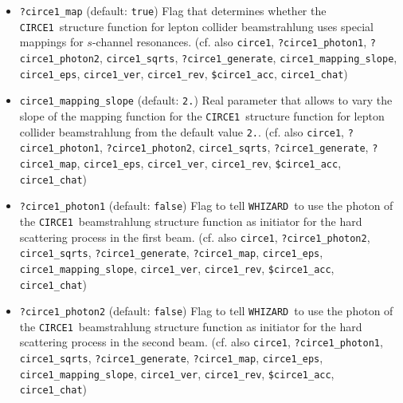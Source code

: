 \documentclass[12pt]{book}
\newcommand{\ttt}[1]{\texttt{#1}}
\newcommand{\whizard}{\texttt{WHIZARD}}
\newcommand{\circeone}{\texttt{CIRCE1}}
\begin{document}
\begin{itemize}
\ttt{?circe1\_map}, \ttt{circe1\_mapping\_slope}, \ttt{circe1\_eps},
\newline \ttt{circe1\_ver}, \ttt{circe1\_rev}, \ttt{\$circe1\_acc},
\ttt{circe1\_chat}) 
\item
\ttt{?circe1\_map} \qquad (default: \ttt{true}) \newline
Flag that determines whether the \circeone\ structure function for
lepton collider beamstrahlung uses special mappings for $s$-channel
resonances. (cf. also \ttt{circe1}, \ttt{?circe1\_photon1},
\newline \ttt{?circe1\_photon2},  \ttt{circe1\_sqrts},
\ttt{?circe1\_generate}, \ttt{circe1\_mapping\_slope}, \ttt{circe1\_eps},
\newline \ttt{circe1\_ver}, \ttt{circe1\_rev}, \ttt{\$circe1\_acc},
\ttt{circe1\_chat}) 
\item
\ttt{circe1\_mapping\_slope} \qquad (default: \ttt{2.}) \newline
Real parameter that allows to vary the slope of the mapping function
for the \circeone\ structure function for lepton collider
beamstrahlung from the default value \ttt{2.}. (cf. also
\ttt{circe1}, \ttt{?circe1\_photon1}, \ttt{?circe1\_photon2}, 
\ttt{circe1\_sqrts},  \ttt{?circe1\_generate}, \ttt{?circe1\_map},
\ttt{circe1\_eps}, \ttt{circe1\_ver}, \ttt{circe1\_rev},
\ttt{\$circe1\_acc}, \ttt{circe1\_chat}) 
\item
\ttt{?circe1\_photon1} \qquad (default: \ttt{false}) \newline
Flag to tell \whizard\ to use the photon of the \circeone\
beamstrahlung structure function as initiator for the hard scattering
process in the first beam. (cf. also \ttt{circe1}, \ttt{?circe1\_photon2},
\ttt{circe1\_sqrts},  \ttt{?circe1\_generate}, \ttt{?circe1\_map},
\ttt{circe1\_eps}, \newline \ttt{circe1\_mapping\_slope}, \ttt{circe1\_ver},
\ttt{circe1\_rev}, \ttt{\$circe1\_acc}, \ttt{circe1\_chat})
\item
\ttt{?circe1\_photon2} \qquad (default: \ttt{false}) \newline
Flag to tell \whizard\ to use the photon of the \circeone\
beamstrahlung structure function as initiator for the hard scattering
process in the second beam. (cf. also \ttt{circe1}, \ttt{?circe1\_photon1},
\ttt{circe1\_sqrts},  \ttt{?circe1\_generate}, \ttt{?circe1\_map},
\ttt{circe1\_eps}, \newline \ttt{circe1\_mapping\_slope}, \ttt{circe1\_ver},
\ttt{circe1\_rev}, \ttt{\$circe1\_acc}, \ttt{circe1\_chat})

\end{itemize}
\end{document}
